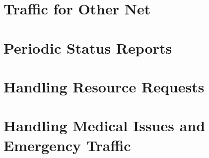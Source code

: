 \documentclass[pdflatex,letterpaper,twoside,12pt]{book}
\begin{document}

\section{Traffic for Other Net}


\section{Periodic Status Reports}


\section{Handling Resource Requests}


\section{Handling Medical Issues and Emergency Traffic}

\iffalse %
We want to change emergencies.. No longer will we hold traffic for nets. We need 
to get back to the "Break Break" for emergency traffic, which then we hold only 
for the traffic, not until the ER is rectified. We need to work  HARD on getting 
Medical onto their own freq. and allowing logistics to handle the ER Dispatch, 
etc. We will be having a meeting in January with Leisha and Dave Polaski in 
regards. Wold like you to be there also. More to come here as we get closer, but 
Were taking control and selling the idea direct to Dave to get his buy in and 
push on Dennis. no more Dennis pushing us around. They need to do their job too!
\fi %

\end{document}
